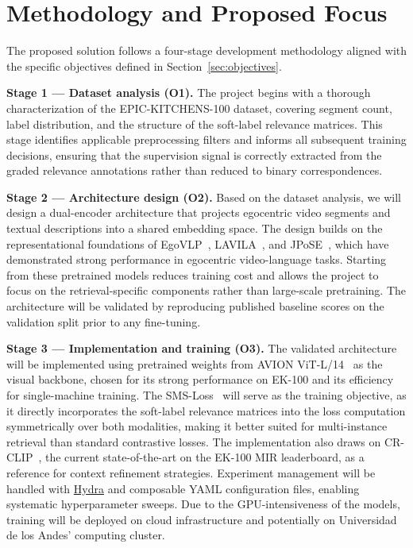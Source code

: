 \section{Methodology and Proposed Focus}

The proposed solution follows a four-stage development methodology aligned with the specific objectives defined in Section~\ref{sec:objectives}.

\textbf{Stage 1 — Dataset analysis (O1).} The project begins with a thorough characterization of the EPIC-KITCHENS-100 dataset, covering segment count, label distribution, and the structure of the soft-label relevance matrices. This stage identifies applicable preprocessing filters and informs all subsequent training decisions, ensuring that the supervision signal is correctly extracted from the graded relevance annotations rather than reduced to binary correspondences.

\textbf{Stage 2 — Architecture design (O2).} Based on the dataset analysis, we will design a dual-encoder architecture that projects egocentric video segments and textual descriptions into a shared embedding space. The design builds on the representational foundations of EgoVLP~\cite{lin2022egovlp}, LAVILA~\cite{zhao2023lavila}, and JPoSE~\cite{wray2019jpose}, which have demonstrated strong performance in egocentric video-language tasks. Starting from these pretrained models reduces training cost and allows the project to focus on the retrieval-specific components rather than large-scale pretraining. The architecture will be validated by reproducing published baseline scores on the validation split prior to any fine-tuning.

\textbf{Stage 3 — Implementation and training (O3).} The validated architecture will be implemented using pretrained weights from AVION ViT-L/14~\cite{zhao2023avion} as the visual backbone, chosen for its strong performance on EK-100 and its efficiency for single-machine training. The SMS-Loss~\cite{wang2024symmetricmultisimilaritylossepickitchens100} will serve as the training objective, as it directly incorporates the soft-label relevance matrices into the loss computation symmetrically over both modalities, making it better suited for multi-instance retrieval than standard contrastive losses. The implementation also draws on CR-CLIP~\cite{he2025crclip}, the current state-of-the-art on the EK-100 MIR leaderboard, as a reference for context refinement strategies. Experiment management will be handled with \href{https://hydra.cc/}{Hydra} and composable YAML configuration files, enabling systematic hyperparameter sweeps. Due to the GPU-intensiveness of the models, training will be deployed on cloud infrastructure and potentially on Universidad de los Andes' computing cluster.

